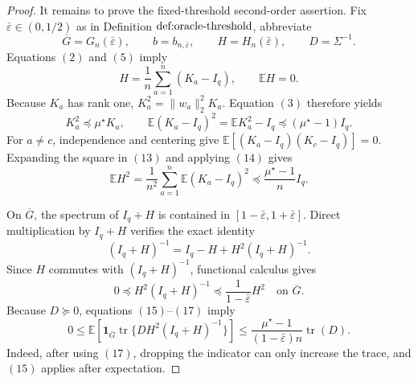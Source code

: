 \documentclass{article}
\begin{document}
\begin{proof}
It remains to prove the fixed-threshold second-order assertion.  Fix \(\bar\varepsilon\in(0,1/2)\) as in Definition \(\textnormal{def:oracle-threshold}\), abbreviate
\[
 \overline G=G_n(\bar\varepsilon),
 \qquad b=b_{n,\bar\varepsilon},
 \qquad H=H_n(\bar\varepsilon),
 \qquad D=\Sigma^{-1}.
\]
Equations \((2)\) and \((5)\) imply
\[
 H=\frac1n\sum_{a=1}^n(K_a-I_q),
 \qquad \mathbb EH=0.
 \tag{13}
\]
Because \(K_a\) has rank one, \(K_a^2=\|w_a\|_2^2K_a\).  Equation \((3)\) therefore yields
\[
 K_a^2\preceq\mu^\star K_a,
 \qquad
 \mathbb E(K_a-I_q)^2=\mathbb EK_a^2-I_q
 \preceq(\mu^\star-1)I_q.
 \tag{14}
\]
For \(a\ne c\), independence and centering give \(\mathbb E[(K_a-I_q)(K_c-I_q)]=0\).  Expanding the square in \((13)\) and applying \((14)\) gives
\[
 \mathbb EH^2
 =\frac1{n^2}\sum_{a=1}^n\mathbb E(K_a-I_q)^2
 \preceq\frac{\mu^\star-1}{n}I_q.
 \tag{15}
\]

On \(\overline G\), the spectrum of \(I_q+H\) is contained in \([1-\bar\varepsilon,1+\bar\varepsilon]\).  Direct multiplication by \(I_q+H\) verifies the exact identity
\[
 (I_q+H)^{-1}=I_q-H+H^2(I_q+H)^{-1}.
 \tag{16}
\]
Since \(H\) commutes with \((I_q+H)^{-1}\), functional calculus gives
\[
 0\preceq H^2(I_q+H)^{-1}
 \preceq\frac1{1-\bar\varepsilon}H^2
 \quad\text{on }\overline G.
 \tag{17}
\]
Because \(D\succeq0\), equations \((15)\)--\((17)\) imply
\[
 0\le
 \mathbb E\!\left[\mathbf 1_{\overline G}
 \operatorname{tr}\{DH^2(I_q+H)^{-1}\}\right]
 \le\frac{\mu^\star-1}{(1-\bar\varepsilon)n}\operatorname{tr}(D).
 \tag{18}
\]
Indeed, after using \((17)\), dropping the indicator can only increase the trace, and \((15)\) applies after expectation.


\end{proof}
\end{document}
